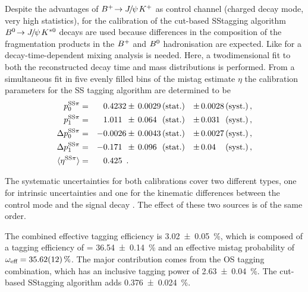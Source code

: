 Despite the advantages of $\BuToJPsiK$ as control channel (charged decay mode,
very high statistics), for the calibration of the cut-based SS\pion tagging
algorithm \mbox{$\BdToJPsiKstar$} decays are used because differences in the
composition of the fragmentation products in the $\Bp$ and $\Bz$ hadronisation
are expected. Like for \BdToDsD a decay-time-dependent mixing analysis is needed.
Here, a twodimensional fit to both the reconstructed decay time and mass
distributions is performed. From a simultaneous fit in five evenly filled bins
of the mistag estimate $\eta$ the calibration parameters for the SS\pion
tagging algorithm are determined to be
\begin{equation}
\begin{aligned}
  p_0^{\text{SS\pion}}        &=& \phantom{+}0.4232  &\pm\, 0.0029 \text{\,(stat.)} &\pm\, 0.0028 \text{\,(syst.)} \, ,\\
  p_1^{\text{SS\pion}}        &=& \phantom{+}1.011\phantom{0}   &\pm\, 0.064\phantom{0} \text{\,(stat.)} &\pm\, 0.031\phantom{0} \text{\,(syst.)} \, ,\\
  \Delta p_0^{\text{SS\pion}} &=& -0.0026 &\pm\, 0.0043 \text{\,(stat.)} &\pm\, 0.0027 \text{\,(syst.)} \, , \\
  \Delta p_1^{\text{SS\pion}} &=& -0.171\phantom{0}   &\pm\, 0.096\phantom{0} \text{\,(stat.)} &\pm\, 0.04\phantom{00} \text{\,(syst.)} \, , \\
  \langle\eta^{\text{SS\pion}}\rangle        &=& \phantom{+}0.425\phantom{0} & .
\end{aligned}
\label{eq:dataanalysis:taggingcalibration:jpsixcalibration:ss_calibration_pars}
\end{equation}

The systematic uncertainties for both calibrations cover two different types,
one for intrinsic uncertainties and one for the kinematic differences between
the control mode and the signal decay \BdToJPsiKS. The effect of these two
sources is of the same order.

The combined effective tagging efficiency is \SI{3.02\pm0.05}{\percent}, which
is composed of a tagging efficiency of \etag = \SI{36.54\pm0.14}{\percent} and
an effective mistag probability of $\mistag_{\textrm{eff}} =
\SI{35.62\pm0.12}{\percent}$. The major contribution comes from the OS tagging
combination, which has an inclusive tagging power of
\SI{2.63\pm0.04}{\percent}. The cut-based SS\pion tagging algorithm adds
\SI{0.376\pm0.024}{\percent}.